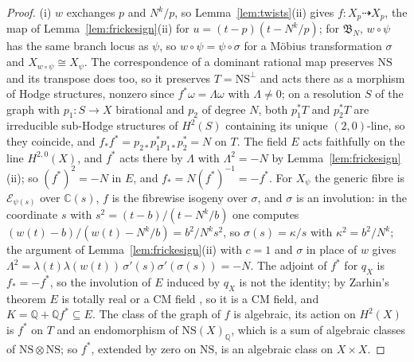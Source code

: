 \documentclass[11pt,reqno]{amsart}
\numberwithin{equation}{section}
\theoremstyle{plain}
\theoremstyle{definition}
\newcommand{\QQ}{\mathbb{Q}}
\newcommand{\CC}{\mathbb{C}}
\newcommand{\NS}{\mathrm{NS}}
\begin{document}
\begin{proof}
(i) $w$ exchanges $p$ and $N^{k}/p$, so Lemma~\ref{lem:twists}(ii) gives $f\colon X_{p}\dashrightarrow X_{p}$, the map of Lemma~\ref{lem:frickesign}(ii) for $u=(t-p)(t-N^{k}/p)$; for $\mathfrak{B}_{N}$, $w\circ\psi$ has the same branch locus as $\psi$, so $w\circ\psi=\psi\circ\sigma$ for a M\"obius transformation $\sigma$ and $X_{w\circ\psi}\cong X_{\psi}$. The correspondence of a dominant rational map preserves $\NS$ and its transpose does too, so it preserves $T=\NS^{\perp}$ and acts there as a morphism of Hodge structures, nonzero since $f^{*}\omega=\Lambda\omega$ with $\Lambda\ne0$; on a resolution $S$ of the graph with $p_{1}\colon S\to X$ birational and $p_{2}$ of degree $N$, both $p_{1}^{*}T$ and $p_{2}^{*}T$ are irreducible sub-Hodge structures of $H^{2}(S)$ containing its unique $(2,0)$-line, so they coincide, and $f_{*}f^{*}=p_{2*}p_{1}^{*}p_{1*}p_{2}^{*}=N$ on $T$. The field $E$ acts faithfully on the line $H^{2,0}(X)$, and $f^{*}$ acts there by $\Lambda$ with $\Lambda^{2}=-N$ by Lemma~\ref{lem:frickesign}(ii); so $(f^{*})^{2}=-N$ in $E$, and $f_{*}=N(f^{*})^{-1}=-f^{*}$. For $X_{\psi}$ the generic fibre is $\mathcal{E}_{\psi(s)}$ over $\CC(s)$, $f$ is the fibrewise isogeny over $\sigma$, and $\sigma$ is an involution: in the coordinate $s$ with $s^{2}=(t-b)/(t-N^{k}/b)$ one computes $(w(t)-b)/(w(t)-N^{k}/b)=b^{2}/N^{k}s^{2}$, so $\sigma(s)=\kappa/s$ with $\kappa^{2}=b^{2}/N^{k}$; the argument of Lemma~\ref{lem:frickesign}(ii) with $c=1$ and $\sigma$ in place of $w$ gives $\Lambda^{2}=\lambda(t)\lambda(w(t))\,\sigma'(s)\sigma'(\sigma(s))=-N$. The adjoint of $f^{*}$ for $q_{X}$ is $f_{*}=-f^{*}$, so the involution of $E$ induced by $q_{X}$ is not the identity; by Zarhin's theorem $E$ is totally real or a CM field \cite[Thm.~1.5.1]{Zar83}, so it is a CM field, and $K=\QQ+\QQ f^{*}\subseteq E$. The class of the graph of $f$ is algebraic, its action on $H^{2}(X)$ is $f^{*}$ on $T$ and an endomorphism of $\NS(X)_{\QQ}$, which is a sum of algebraic classes of $\NS\otimes\NS$; so $f^{*}$, extended by zero on $\NS$, is an algebraic class on $X\times X$.


\end{proof}
\end{document}
